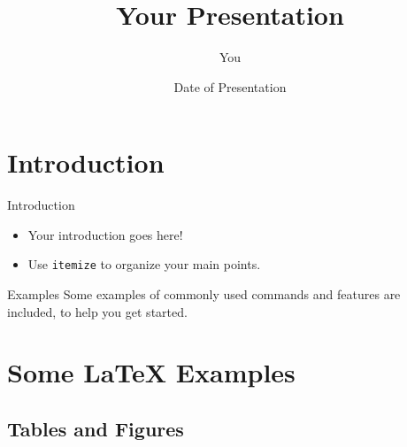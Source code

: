 \documentclass[color=usenames,dvipsnames]{beamer}
\title[Your Short Title]{Your Presentation}
\author{You}
\institute{Where You're From}
\date{Date of Presentation}
\begin{document}
\begin{frame}
  \titlepage
\end{frame}


\section{Introduction}

\begin{frame}{Introduction}

\begin{itemize}
  \item Your introduction goes here!
  \item Use \texttt{itemize} to organize your main points.
\end{itemize}

\vskip 1cm

\begin{block}{Examples}
Some examples of commonly used commands and features are included, to help you get started.
\end{block}

\end{frame}

\section{Some \LaTeX{} Examples}

\subsection{Tables and Figures}
\end{document}
